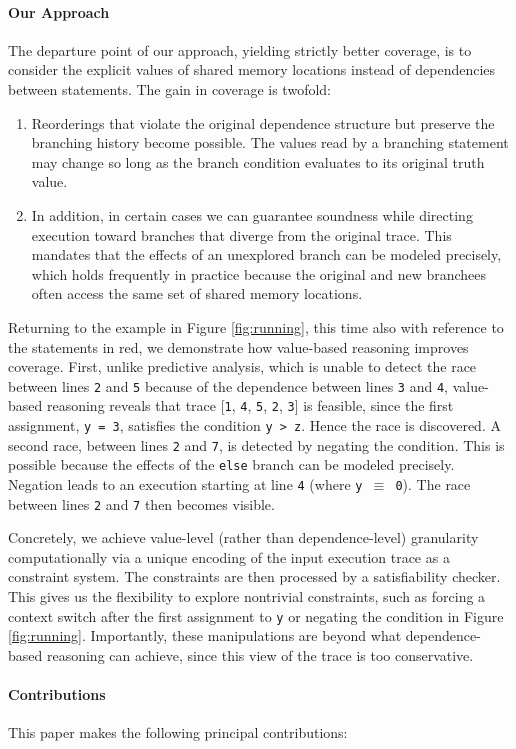  \paragraph{Our Approach} The departure point of our approach, yielding strictly better coverage, is to consider the explicit values of shared memory locations instead of dependencies between statements. The gain in coverage is twofold:
 \begin{enumerate}
 	\item Reorderings that violate the original dependence structure but preserve the branching history become possible. The values read by a branching statement may change so long as the branch condition evaluates to its original truth value.
 	\item In addition, in certain cases we can guarantee soundness while directing execution toward branches that diverge from the original trace. This mandates that the effects of an unexplored branch can be modeled precisely, which holds frequently in practice because the original and new branchees often access the same set of shared memory locations.
 \end{enumerate}
 
 Returning to the example in Figure \ref{fig:running}, this time also with reference to the statements in red, we demonstrate how value-based reasoning improves coverage. First, unlike predictive analysis, which is unable to detect the race between lines {\tt 2} and {\tt 5} because of the dependence between lines {\tt 3} and {\tt 4}, value-based reasoning reveals that trace 
 [{\tt 1}, {\tt 4}, {\tt 5}, {\tt 2}, {\tt 3}] is feasible, since the first assignment, {\tt y = 3}, satisfies the condition {\tt y > z}. Hence the race is discovered. A second race, between lines {\tt 2} and {\tt 7}, is detected by negating the condition. This is possible because the effects of the {\tt else} branch can be modeled precisely.
 Negation leads to an execution starting at line {\tt 4} (where {\tt y $\equiv$ 0}). The race between lines {\tt 2} and {\tt 7} then becomes visible.
 
 Concretely, we achieve value-level (rather than dependence-level) granularity computationally via a unique encoding of the input execution trace as a constraint system. The constraints are then processed by a satisfiability checker. This gives us the flexibility to explore nontrivial constraints, such as 
 forcing a context switch after the first assignment to {\tt y} or negating the condition in Figure \ref{fig:running}. Importantly, these manipulations are beyond what dependence-based reasoning can achieve, since this view of the trace is too conservative.
 
\paragraph{Contributions} This paper makes the following principal contributions:



